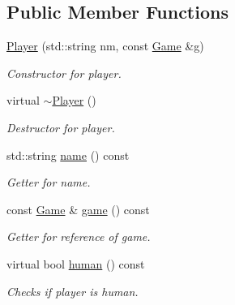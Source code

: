 \subsection*{Public Member Functions}
\begin{DoxyCompactItemize}
\item 
\mbox{\label{class_player_adebc0e1afa34a20c0be570f8e9e3a9bf}} 
\mbox{\hyperlink{class_player_adebc0e1afa34a20c0be570f8e9e3a9bf}{Player}} (std\+::string nm, const \mbox{\hyperlink{class_game}{Game}} \&g)
\begin{DoxyCompactList}\small\item\em Constructor for player. \end{DoxyCompactList}\item 
\mbox{\label{class_player_a8981c201ffb2270c0b6dbd467b627376}} 
virtual \mbox{\hyperlink{class_player_a8981c201ffb2270c0b6dbd467b627376}{$\sim$\+Player}} ()
\begin{DoxyCompactList}\small\item\em Destructor for player. \end{DoxyCompactList}\item 
\mbox{\label{class_player_a422139ad63182cfc9f82305b87a3f9a5}} 
std\+::string \mbox{\hyperlink{class_player_a422139ad63182cfc9f82305b87a3f9a5}{name}} () const
\begin{DoxyCompactList}\small\item\em Getter for name. \end{DoxyCompactList}\item 
\mbox{\label{class_player_ab4ef841709083fe60f6647ce0a7ca816}} 
const \mbox{\hyperlink{class_game}{Game}} \& \mbox{\hyperlink{class_player_ab4ef841709083fe60f6647ce0a7ca816}{game}} () const
\begin{DoxyCompactList}\small\item\em Getter for reference of game. \end{DoxyCompactList}\item 
\mbox{\label{class_player_a47c5497b2d8bf5d745e85952d0bf097f}} 
virtual bool \mbox{\hyperlink{class_player_a47c5497b2d8bf5d745e85952d0bf097f}{human}} () const
\begin{DoxyCompactList}\small\item\em Checks if player is human. \end{DoxyCompactList}\item 

\end{DoxyCompactItemize}

